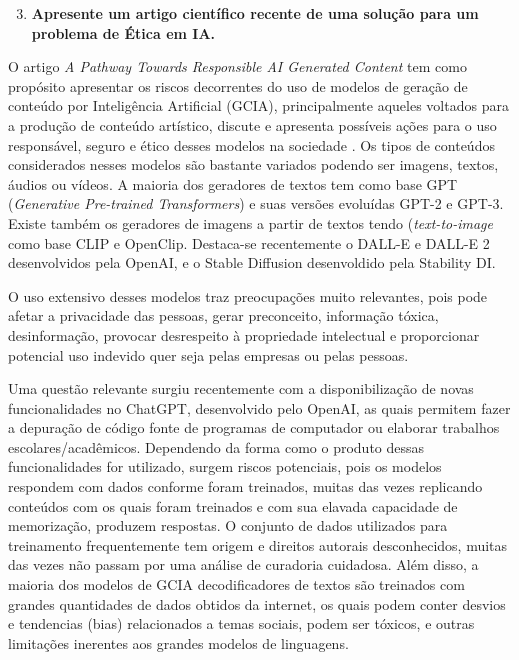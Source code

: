 \begin{enumerate}\setcounter{enumi}{2}\bfseries
    \item  \textbf{Apresente um artigo científico recente de uma solução para um problema de Ética em IA.}
\end{enumerate}

O artigo \textit{A Pathway Towards Responsible AI Generated Content} tem como propósito apresentar 
os riscos decorrentes do uso de modelos de geração de conteúdo por Inteligência Artificial (GCIA), 
principalmente aqueles voltados para a produção de conteúdo artístico,
discute e apresenta possíveis ações para o uso responsável, seguro e ético desses modelos na 
sociedade \cite{chen2023pathway}.
Os tipos de conteúdos considerados nesses modelos são bastante variados podendo ser imagens, textos, 
áudios ou vídeos. A maioria dos geradores de textos tem como base GPT
(\textit{Generative Pre-trained Transformers}) e suas versões evoluídas GPT-2 e GPT-3. 
Existe também os geradores de imagens a partir de textos tendo (\textit{text-to-image} 
como base CLIP e OpenClip. Destaca-se 
recentemente o DALL-E e DALL-E 2 desenvolvidos pela OpenAI, e o Stable Diffusion desenvoldido pela 
Stability DI.

O uso extensivo desses modelos traz preocupações muito relevantes, pois pode afetar a privacidade das pessoas, 
gerar preconceito, informação tóxica, desinformação, provocar desrespeito à propriedade intelectual e 
proporcionar potencial uso indevido quer seja pelas empresas ou pelas pessoas. 

Uma questão relevante surgiu recentemente com a disponibilização de novas funcionalidades no ChatGPT, desenvolvido 
pelo OpenAI, as quais permitem fazer a depuração de código fonte de programas de 
computador ou elaborar trabalhos escolares/acadêmicos. Dependendo da forma como o produto dessas funcionalidades 
for utilizado, surgem riscos potenciais, pois os modelos respondem com dados conforme foram treinados, muitas das 
vezes replicando conteúdos com os quais foram treinados e com sua elavada capacidade de memorização, produzem respostas.
O conjunto de dados utilizados para treinamento frequentemente tem origem e direitos autorais desconhecidos,
muitas das vezes não passam por uma análise de curadoria cuidadosa. 
Além disso, a maioria dos modelos de GCIA decodificadores de textos são treinados com grandes quantidades 
de dados obtidos da internet, os quais podem conter desvios e tendencias (bias) relacionados a temas sociais, podem ser tóxicos, 
e outras limitações inerentes aos grandes modelos de linguagens.

